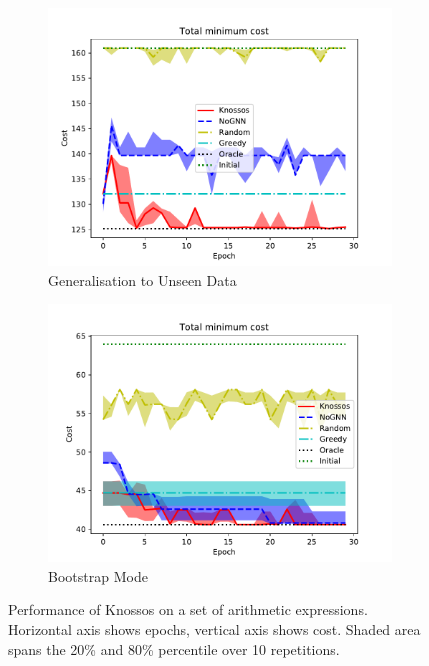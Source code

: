 \documentclass[fullpage,twocolumn]{article} %
\begin{document}
\begin{figure}[t!]
	\centering
  	\begin{subfigure}[t]{0.45\textwidth}
  		\centering
	    \includegraphics[width=\textwidth]{generalization.pdf}
	    \caption{Generalisation to Unseen Data}
	    \label{generalization}
	\end{subfigure}%
  	\begin{subfigure}[t]{0.45\textwidth}
  		\centering
	    \includegraphics[width=\textwidth]{combined.pdf}
	    \caption{Bootstrap Mode}
	    \label{combined}
	\end{subfigure}
    \caption{Performance of Knossos on a set of arithmetic expressions. Horizontal axis shows epochs, vertical axis shows cost. Shaded area spans the 20\% and 80\% percentile over 10 repetitions.}
    \label{benchmark-arithmetic}
\end{figure}
\end{document}
